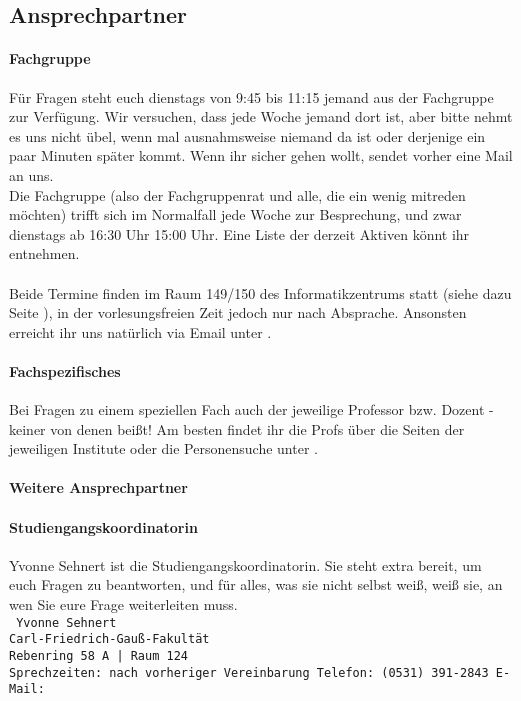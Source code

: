 
\subsection{Ansprechpartner}
\paragraph{Fachgruppe}
Für Fragen steht euch dienstags von 9:45 bis 11:15 jemand aus der Fachgruppe zur Verfügung. Wir versuchen, dass jede Woche jemand dort ist, aber bitte nehmt es uns nicht übel, wenn mal ausnahmsweise niemand da ist oder derjenige ein paar Minuten später kommt. Wenn ihr sicher gehen wollt, sendet vorher eine Mail an uns.\\
Die Fachgruppe (also der Fachgruppenrat und alle, die ein wenig
mitreden möchten) trifft sich im Normalfall jede Woche zur
Besprechung,  und zwar dienstags ab 16:30 Uhr 15:00 Uhr. Eine Liste
der derzeit Aktiven könnt ihr
 entnehmen.
\\\\
Beide Termine finden im Raum 149/150 des Informatikzentrums statt
(siehe dazu Seite \pageref{campuskarte}), in der vorlesungsfreien Zeit
jedoch nur nach Absprache. Ansonsten erreicht ihr uns natürlich via
Email unter .\\
\paragraph{Fachspezifisches}
Bei Fragen zu einem speziellen Fach auch der jeweilige Professor
bzw. Dozent - keiner von denen beißt! Am besten findet ihr die Profs
über die Seiten der jeweiligen Institute oder die Personensuche unter
.
\paragraph{Weitere Ansprechpartner}
\paragraph{\small Studiengangskoordinatorin} Yvonne Sehnert ist die Studiengangskoordinatorin. Sie steht extra bereit,
um euch Fragen zu beantworten, und für alles, was sie nicht selbst
weiß, weiß sie, an wen Sie eure Frage weiterleiten muss.\\
{\texttt{
Yvonne Sehnert\\
Carl-Friedrich-Gauß-Fakultät\\
Rebenring 58 A | Raum 124\\
Sprechzeiten: nach vorheriger Vereinbarung
Telefon: (0531) 391-2843
E-Mail: 
}}
